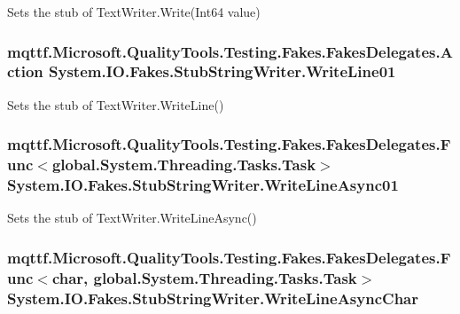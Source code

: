 Sets the stub of Text\-Writer.\-Write(\-Int64 value)

\hypertarget{class_system_1_1_i_o_1_1_fakes_1_1_stub_string_writer_a198abc00c341d34e69a98ca06504870d}{
\subsubsection[{Write\-Line01}]{\setlength{\rightskip}{0pt plus 5cm}mqttf.\-Microsoft.\-Quality\-Tools.\-Testing.\-Fakes.\-Fakes\-Delegates.\-Action System.\-I\-O.\-Fakes.\-Stub\-String\-Writer.\-Write\-Line01}}\label{class_system_1_1_i_o_1_1_fakes_1_1_stub_string_writer_a198abc00c341d34e69a98ca06504870d}


Sets the stub of Text\-Writer.\-Write\-Line()

\hypertarget{class_system_1_1_i_o_1_1_fakes_1_1_stub_string_writer_acae04b559c4e4aa77fe04ce4102bce86}{
\subsubsection[{Write\-Line\-Async01}]{\setlength{\rightskip}{0pt plus 5cm}mqttf.\-Microsoft.\-Quality\-Tools.\-Testing.\-Fakes.\-Fakes\-Delegates.\-Func$<$global.\-System.\-Threading.\-Tasks.\-Task$>$ System.\-I\-O.\-Fakes.\-Stub\-String\-Writer.\-Write\-Line\-Async01}}\label{class_system_1_1_i_o_1_1_fakes_1_1_stub_string_writer_acae04b559c4e4aa77fe04ce4102bce86}


Sets the stub of Text\-Writer.\-Write\-Line\-Async()

\hypertarget{class_system_1_1_i_o_1_1_fakes_1_1_stub_string_writer_acdc4a0259d9d7fed0a263ad9dd866b7e}{
\subsubsection[{Write\-Line\-Async\-Char}]{\setlength{\rightskip}{0pt plus 5cm}mqttf.\-Microsoft.\-Quality\-Tools.\-Testing.\-Fakes.\-Fakes\-Delegates.\-Func$<$char, global.\-System.\-Threading.\-Tasks.\-Task$>$ System.\-I\-O.\-Fakes.\-Stub\-String\-Writer.\-Write\-Line\-Async\-Char}}\label{class_system_1_1_i_o_1_1_fakes_1_1_stub_string_writer_acdc4a0259d9d7fed0a263ad9dd866b7e}


